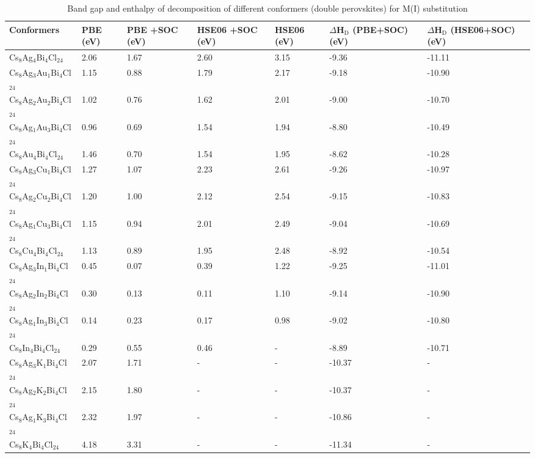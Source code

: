 \documentclass[journal=jpclcd,manuscript=letter]{achemso}
\begin{document}
\begin{table}
\caption{Band gap and enthalpy of decomposition of different conformers (double perovskites) for M(I) substitution} 
\centering
\begin{tabular}{p{3.8cm} p{1.2cm}p{1.2cm}p{1.2cm}p{1.2cm}p{2.2cm}p{2.4cm}} \hline
	Conformers & PBE (eV)& PBE +SOC (eV) & HSE06 +SOC (eV)& HSE06 (eV)& $\Delta$H$_{\textrm{D}}$ (PBE+SOC) (eV) &$\Delta$H$_{\textrm{D}}$ (HSE06+SOC) (eV)\\ \hline		
	
	Cs$_8$Ag$_4$Bi$_4$Cl$_{24}$ & 2.06 & 1.67 & 2.60 & 3.15& -9.36&	-11.11\\ \hline		
	Cs$_8$Ag$_{3}$Au$_{1}$Bi$_4$Cl$_{24}$ & 1.15 & 0.88 & 1.79 & 2.17& -9.18&	-10.90\\ \hline
	Cs$_8$Ag$_{2}$Au$_{2}$Bi$_4$Cl$_{24}$ & 1.02 & 0.76 & 1.62 & 2.01& -9.00&	-10.70\\ \hline
	Cs$_8$Ag$_{1}$Au$_{3}$Bi$_4$Cl$_{24}$ & 0.96 & 0.69 &  1.54 & 1.94& -8.80	&-10.49\\ \hline			
	Cs$_8$Au$_4$Bi$_4$Cl$_{24}$ & 1.46 & 0.70 & 1.54 & 1.95& -8.62&	-10.28 \\ \hline
	Cs$_8$Ag$_{3}$Cu$_{1}$Bi$_4$Cl$_{24}$ & 1.27 & 1.07 & 2.23 & 2.61& -9.26&	-10.97\\ \hline
	Cs$_8$Ag$_{2}$Cu$_{2}$Bi$_4$Cl$_{24}$ & 1.20 & 1.00 & 2.12 & 2.54 & -9.15&	-10.83\\ \hline
	Cs$_8$Ag$_{1}$Cu$_{3}$Bi$_4$Cl$_{24}$ & 1.15 & 0.94 & 2.01 & 2.49& -9.04&	-10.69 \\ \hline
	Cs$_8$Cu$_4$Bi$_4$Cl$_{24}$ & 1.13 & 0.89 & 1.95 & 2.48& -8.92	&-10.54
	\\ \hline
	Cs$_8$Ag$_{3}$In$_{1}$Bi$_4$Cl$_{24}$ & 0.45 & 0.07 & 0.39 & 1.22& -9.25&	-11.01\\ \hline
	Cs$_8$Ag$_{2}$In$_{2}$Bi$_4$Cl$_{24}$ & 0.30 & 0.13 & 0.11 &1.10& -9.14&	-10.90\\ \hline
	Cs$_8$Ag$_{1}$In$_{3}$Bi$_4$Cl$_{24}$ & 0.14 & 0.23 & 0.17 & 0.98& -9.02&	-10.80\\ \hline
	Cs$_8$In$_4$Bi$_4$Cl$_{24}$ & 0.29 & 0.55 & 0.46 & -& -8.89&-10.71\\ \hline
	Cs$_8$Ag$_{3}$K$_{1}$Bi$_4$Cl$_{24}$ &2.07&1.71&-&-& -10.37&-\\ \hline
	Cs$_8$Ag$_{2}$K$_{2}$Bi$_4$Cl$_{24}$ & 2.15&1.80&-&-& -10.37&-\\ \hline
	Cs$_8$Ag$_{1}$K$_{3}$Bi$_4$Cl$_{24}$ &2.32&1.97&-&-& -10.86&-\\ \hline
	Cs$_8$K$_4$Bi$_4$Cl$_{24}$ & 4.18 & 3.31&-&-& -11.34&-\\ \hline

\end{tabular}
\end{table}
\end{document}

